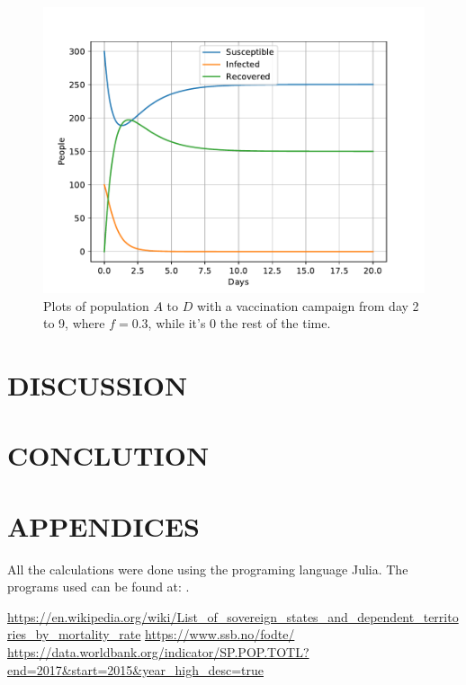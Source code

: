 \documentclass[a4paper]{article}
\let\Oldsection\section
\renewcommand{\section}{\FloatBarrier\Oldsection}
\begin{document}
\begin{figure}[!htb]
	\includegraphics[scale=0.56]{../plots/opp_e_fd.pdf}
	\caption{Plots of population $A$ to $D$ with a vaccination campaign from day 2 to 9, where $f=0.3$, while it's 0 the rest of the time.}
	\label{opp_e2}
\end{figure}



\section{DISCUSSION}



\section{CONCLUTION}




\section{APPENDICES}
All the calculations were done using the programing language Julia. The programs used can be found at:
\url{}.
	
\begin{thebibliography}{9}
	\url{https://en.wikipedia.org/wiki/List_of_sovereign_states_and_dependent_territories_by_mortality_rate}
	\url{https://www.ssb.no/fodte/}
	\url{https://data.worldbank.org/indicator/SP.POP.TOTL?end=2017&start=2015&year_high_desc=true}
\end{thebibliography}
\end{document}
